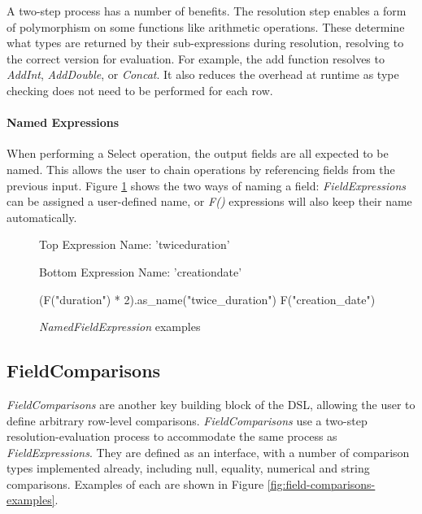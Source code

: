 A two-step process has a number of benefits. The resolution step enables a form of polymorphism on some functions like arithmetic operations. These determine what types are returned by their sub-expressions during resolution, resolving to the correct version for evaluation. For example, the add function resolves to \textit{AddInt}, \textit{AddDouble}, or \textit{Concat}. It also reduces the overhead at runtime as type checking does not need to be performed for each row.

\paragraph{Named Expressions}
When performing a Select operation, the output fields are all expected to be named. This allows the user to chain operations by referencing fields from the previous input. Figure \ref{fig:namedfieldexpression-examples} shows the two ways of naming a field: \textit{FieldExpressions} can be assigned a user-defined name, or \textit{F()} expressions will also keep their name automatically.

\begin{figure}[htp]
	Top Expression Name: 'twice\textunderscore duration'
	
	Bottom Expression Name: 'creation\textunderscore date'
	\begin{python}
(F("duration") * 2).as_name("twice_duration")
F("creation_date")
	\end{python}
	\caption{\textit{NamedFieldExpression} examples}
	\label{fig:namedfieldexpression-examples}
\end{figure}

\subsection{FieldComparisons}\label{subsec:fieldcomparisons}
\textit{FieldComparisons} are another key building block of the DSL, allowing the user to define arbitrary row-level comparisons. \textit{FieldComparisons} use a two-step resolution-evaluation process to accommodate the same process as \textit{FieldExpressions}. They are defined as an interface, with a number of comparison types implemented already, including null, equality, numerical and string comparisons. Examples of each are shown in Figure \ref{fig:field-comparisons-examples}.


